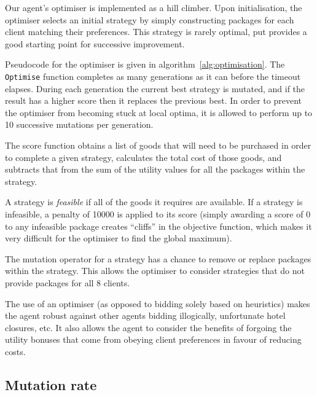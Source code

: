 \documentclass[a4paper]{proc}
\begin{document}
Our agent's optimiser is implemented as a hill climber. Upon initialisation, the optimiser selects an initial strategy by simply constructing packages for each client matching their preferences. This strategy is rarely optimal, put provides a good starting point for successive improvement.

Pseudocode for the optimiser is given in algorithm~\ref{alg:optimisation}. The \texttt{Optimise} function completes as many generations as it can before the timeout elapses. During each generation the current best strategy is mutated, and if the result has a higher score then it replaces the previous best. In order to prevent the optimiser from becoming stuck at local optima, it is allowed to perform up to 10 successive mutations per generation.

The score function obtains a list of goods that will need to be purchased in order to complete a given strategy, calculates the total cost of those goods, and subtracts that from the sum of the utility values for all the packages within the strategy.

A strategy is \emph{feasible} if all of the goods it requires are available. If a strategy is infeasible, a penalty of 10000 is applied to its score (simply awarding a score of 0 to any infeasible package creates ``cliffs'' in the objective function, which makes it very difficult for the optimiser to find the global maximum).

The mutation operator for a strategy has a chance to remove or replace packages within the strategy. This allows the optimiser to consider strategies that do not provide packages for all 8 clients.

The use of an optimiser (as opposed to bidding solely based on heuristics) makes the agent robust against other agents bidding illogically, unfortunate hotel closures, etc. It also allows the agent to consider the benefits of forgoing the utility bonuses that come from obeying client preferences in favour of reducing costs.

\subsection{Mutation rate}
\end{document}
